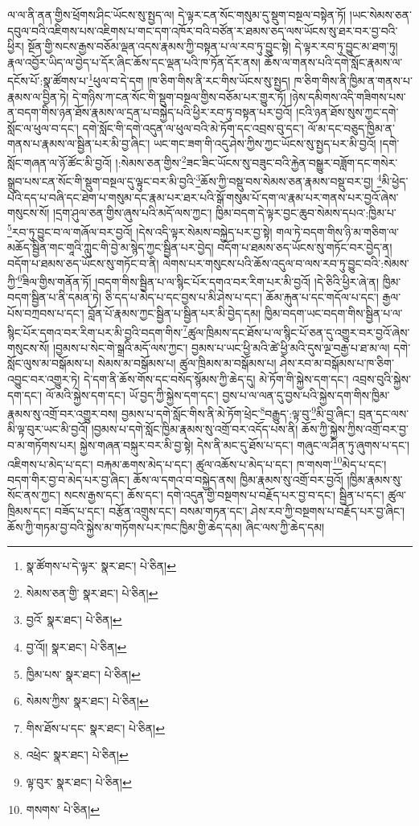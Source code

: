 ལ་ལ་ནི་ནན་གྱིས་ཕྲོགས་ཤིང་ཡོངས་སུ་སྤྱད་ལ། དེ་ལྟར་ངན་སོང་གསུམ་དུ་སྡུག་བསྔལ་བསྟེན་ཏོ། །ཡང་སེམས་ཅན་དབུལ་བའི་འཇིགས་པས་འཇིགས་པ་གང་དག་འཁོར་བའི་བཙོན་ར་ཐམས་ཅད་ལས་ཡོངས་སུ་ཐར་བར་བྱ་བའི་ཕྱིར། སྔོན་གྱི་སངས་རྒྱས་བཅོམ་ལྡན་འདས་རྣམས་ཀྱི་བསྟན་པ་ལ་རབ་ཏུ་བྱུང་སྟེ། དེ་ལྟར་རབ་ཏུ་བྱུང་མ་ཐག་ཏུ། རྣལ་འབྱོར་ཡིད་ལ་བྱེད་པ་དོར་ཞིང་ཆོས་དང་ལྡན་པའི་ཁ་ཏོན་དོར་ནས། ཆོས་ལ་གནས་པའི་དགེ་སློང་རྣམས་ལ་དངོས་པོ་:སྣ་ཚོགས་པ་\footnote{སྣ་ཚོགས་པ་དེ་ལྟར་  སྣར་ཐང་།  པེ་ཅིན། }ཕུལ་བ་དེ་དག །ཁ་ཅིག་གིས་ནི་རང་གིས་ཡོངས་སུ་སྤྱད། ཁ་ཅིག་གིས་ནི་ཁྱིམ་ན་གནས་པ་རྣམས་ལ་བྱིན་ཏེ། དེ་གཉིས་ཀ་ངན་སོང་གི་སྡུག་བསྔལ་གྱིས་བཅོམ་པར་གྱུར་ཏོ། །ཉེས་དམིགས་འདི་གཟིགས་པས་ན་བདག་གིས་ཉན་ཐོས་རྣམས་ལ་དྲན་པ་བསྐྱེད་པའི་ཕྱིར་རབ་ཏུ་བསྟན་པར་བྱའོ། །ངའི་ཉན་ཐོས་སུས་ཀྱང་དགེ་སློང་ལ་ཕུལ་བ་དང་། དགེ་སློང་གི་དགེ་འདུན་ལ་ཕུལ་བའི་མེ་ཏོག་དང་འབྲས་བུ་དང་། ལོ་མ་དང་བཅུད་ཁྱིམ་ན་གནས་པ་རྣམས་ལ་སྦྱིན་པར་མི་བྱ་ཞིང་། ཡང་གང་ཟག་གི་འདུ་ཤེས་ཀྱིས་ཀྱང་ཡོངས་སུ་སྤྱད་པར་མི་བྱའོ། །དགེ་སློང་གཞན་ལ་ཉོ་ཚོང་མི་བྱའོ། །:སེམས་ཅན་གྱིས་\footnote{སེམས་ཅན་གྱི་  སྣར་ཐང་།  པེ་ཅིན། }ཟང་ཟིང་ཡོངས་སུ་བཟུང་བའི་རྐྱེན་བསྒྱུར་བཟློག་དང་གསེར་སྒྲུབ་པས་ངན་སོང་གི་སྡུག་བསྔལ་དུ་ལྟུང་བར་མི་བྱའི་\footnote{བྱའོ་  སྣར་ཐང་།  པེ་ཅིན། }ཆོས་ཀྱི་བསྡུ་བས་སེམས་ཅན་རྣམས་བསྡུ་བར་བྱ། \footnote{བྱ་འོ།།   སྣར་ཐང་།  པེ་ཅིན། }མི་ཕྱེད་པའི་དད་པ་བཞི་དང་ཐེག་པ་གསུམ་དང་རྣམ་པར་ཐར་པའི་སྒོ་གསུམ་པོ་དག་ལ་རྣམ་པར་གནས་པར་བྱའོ་ཞེས་གསུངས་སོ། །དྲག་ཤུལ་ཅན་གྱིས་ཞུས་པའི་མདོ་ལས་ཀྱང་། ཁྱིམ་བདག་དེ་ལྟར་བྱང་ཆུབ་སེམས་དཔའ་:ཁྱིམ་པ་\footnote{ཁྱིམ་པས་  སྣར་ཐང་།  པེ་ཅིན། }རབ་ཏུ་བྱུང་བ་ལ་གཞོལ་བར་བྱའོ། །དེས་འདི་ལྟར་སེམས་བསྐྱེད་པར་བྱ་སྟེ། གལ་ཏེ་བདག་གིས་ཉི་མ་གཅིག་ལ་མཆོད་སྦྱིན་གང་གཱའི་ཀླུང་གི་བྱེ་མ་སྙེད་ཀྱང་སྦྱིན་པར་བྱེད། བདོག་པ་ཐམས་ཅད་ཡོངས་སུ་གཏོང་བར་བྱེད་ན། བདོག་པ་ཐམས་ཅད་ཡོངས་སུ་གཏོང་བ་ནི། ལེགས་པར་གསུངས་པའི་ཆོས་འདུལ་བ་ལས་རབ་ཏུ་བྱུང་བའི་:སེམས་ཀྱི་\footnote{སེམས་ཀྱིས་  སྣར་ཐང་།  པེ་ཅིན། }ཟིལ་གྱིས་གནོན་ཏོ། །བདག་གིས་སྦྱིན་པ་ལ་སྙིང་པོར་དགའ་བར་རིག་པར་མི་བྱའོ། །དེ་ཅིའི་ཕྱིར་ཞེ་ན། ཁྱིམ་བདག་སྦྱིན་པ་ནི་དམན་ཏེ། ཅི་དད་པ་མེད་པ་དང་བྱས་པ་མི་ཤེས་པ་དང་། ཆོམ་རྐུན་པ་དང་གདོལ་པ་དང་། རྒྱལ་པོས་བཀྲབས་པ་དང་། བློན་པོ་རྣམས་ཀྱང་སྦྱིན་པ་སྦྱིན་པར་མི་བྱེད་དམ། ཁྱིམ་བདག་ཡང་བདག་གིས་སྦྱིན་པ་ལ་སྙིང་པོར་དགའ་བར་རིག་པར་མི་བྱའི་བདག་གིས་\footnote{གིས་ཐོས་པ་དང་  སྣར་ཐང་།  པེ་ཅིན། }ཚུལ་ཁྲིམས་དང་ཐོས་པ་ལ་སྙིང་པོ་ཅན་དུ་འགྱུར་བར་བྱའོ་ཞེས་གསུངས་སོ། །བྱམས་པ་སེང་གེ་སྒྲའི་མདོ་ལས་ཀྱང་། བྱམས་པ་ཡང་ཕྱི་མའི་ཚེ་ཕྱི་མའི་དུས་ལྔ་བརྒྱ་པ་ཐ་མ་ལ། དགེ་སློང་ལུས་མ་བསྒོམས་པ། སེམས་མ་བསྒོམས་པ། ཚུལ་ཁྲིམས་མ་བསྒོམས་པ། ཤེས་རབ་མ་བསྒོམས་པ་ཁ་ཅིག་འབྱུང་བར་འགྱུར་ཏེ། དེ་དག་ནི་ཆོས་གོས་དང་བསོད་སྙོམས་ཀྱི་ཆེད་དུ། མེ་ཏོག་གི་སྐྱེས་དག་དང་། འབྲས་བུའི་སྐྱེས་དག་དང་། ལོ་མའི་སྐྱེས་དག་དང་། ཡོ་བྱད་ཀྱི་སྐྱེས་དག་དང་། བྱས་པ་ལ་ལན་དུ་བྱས་པའི་སྐྱེས་དག་གིས་ཁྱིམ་རྣམས་སུ་འགྲོ་བར་འགྱུར་བས། བྱམས་པ་དགེ་སློང་གིས་ནི་མེ་ཏོག་ཕྲེང་\footnote{འཕྲེང་  སྣར་ཐང་།  པེ་ཅིན། }བརྒྱུད་:ལྟ་བུ་\footnote{ལྟ་བུར་  སྣར་ཐང་།  པེ་ཅིན། }མི་བྱ་ཞིང་། བྲན་དང་ལས་མི་ལྟ་བུར་ཡང་མི་བྱའོ། །བྱམས་པ་དགེ་སློང་ཁྱིམ་རྣམས་སུ་འགྲོ་བར་འདོད་པས་ནི། ཆོས་ཀྱི་སྐྱེས་ཀྱིས་འགྲོ་བར་བྱ་བ་མ་གཏོགས་པར། སྐྱེས་གཞན་བསྐུར་བར་མི་བྱ་སྟེ། དེས་ནི་མང་དུ་ཐོས་པ་དང་། གཞུང་ལ་ཤིན་ཏུ་ཞུགས་པ་དང་། འཇིགས་པ་མེད་པ་དང་། བརྐམ་ཆགས་མེད་པ་དང་། ཚུལ་འཆོས་པ་མེད་པ་དང་། ཁ་གསག་\footnote{གསགས་  པེ་ཅིན། }མེད་པ་དང་། བདག་གིར་བྱ་བ་མེད་པར་བྱ་ཞིང་། ཆོས་ལ་དགའ་བ་བསྐྱེད་ནས། ཁྱིམ་རྣམས་སུ་འགྲོ་བར་བྱའོ། །ཁྱིམ་རྣམས་སུ་སོང་ནས་ཀྱང་། སངས་རྒྱས་དང་། ཆོས་དང་། དགེ་འདུན་གྱི་བསྔགས་པ་བརྗོད་པར་བྱ་བ་དང་། སྦྱིན་པ་དང་། ཚུལ་ཁྲིམས་དང་། བཟོད་པ་དང་། བརྩོན་འགྲུས་དང་། བསམ་གཏན་དང་། ཤེས་རབ་ཀྱི་བསྔགས་པ་བརྗོད་པར་བྱ་ཞིང་། ཆོས་ཀྱི་གཏམ་བྱ་བའི་སྐྱེས་མ་གཏོགས་པར་ཁང་ཁྱིམ་གྱི་ཆེད་དམ། ཞིང་ལས་ཀྱི་ཆེད་དམ། 
